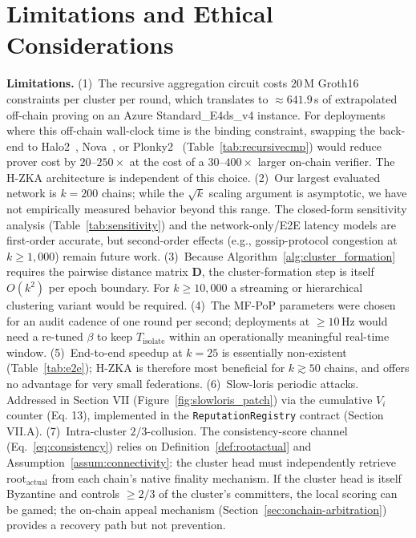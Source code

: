\documentclass[journal]{IEEEtran}
\begin{document}
\section{Limitations and Ethical Considerations}
\label{sec:limitations}

\textbf{Limitations.} (1)~The recursive aggregation circuit costs $20\,$M Groth16 constraints per cluster per round, which translates to $\approx 641.9$\,s of extrapolated off-chain proving on an Azure Standard\_E4ds\_v4 instance. For deployments where this off-chain wall-clock time is the binding constraint, swapping the back-end to Halo2~\cite{bowe2019halo}, Nova~\cite{kothapalli2022nova}, or Plonky2~\cite{plonky2} (Table~\ref{tab:recursivecmp}) would reduce prover cost by $20$--$250\times$ at the cost of a $30$--$400\times$ larger on-chain verifier. The H-ZKA architecture is independent of this choice.
(2)~Our largest evaluated network is $k=200$ chains; while the $\sqrt{k}$ scaling argument is asymptotic, we have not empirically measured behavior beyond this range. The closed-form sensitivity analysis (Table~\ref{tab:sensitivity}) and the network-only/E2E latency models are first-order accurate, but second-order effects (e.g., gossip-protocol congestion at $k\!\ge\!1{,}000$) remain future work.
(3)~Because Algorithm~\ref{alg:cluster_formation} requires the pairwise distance matrix $\mathbf{D}$, the cluster-formation step is itself $O(k^2)$ per epoch boundary. For $k\!\ge\!10{,}000$ a streaming or hierarchical clustering variant would be required.
(4)~The MF-PoP parameters were chosen for an audit cadence of one round per second; deployments at $\ge 10\,$Hz would need a re-tuned $\beta$ to keep $T_{\mathrm{isolate}}$ within an operationally meaningful real-time window.
(5)~End-to-end speedup at $k=25$ is essentially non-existent (Table~\ref{tab:e2e}); H-ZKA is therefore most beneficial for $k \gtrsim 50$ chains, and offers no advantage for very small federations.
(6)~{Slow-loris periodic attacks.} Addressed in Section VII (Figure~\ref{fig:slowloris_patch}) via the cumulative $V_i$ counter (Eq. 13), implemented in the \texttt{ReputationRegistry} contract (Section VII.A).
(7)~{Intra-cluster $2/3$-collusion.} The consistency-score channel (Eq.~\ref{eq:consistency}) relies on Definition~\ref{def:rootactual} and Assumption~\ref{assum:connectivity}: the cluster head must independently retrieve $\text{root}_{\text{actual}}$ from each chain's native finality mechanism. If the cluster head is itself Byzantine {and} controls $\ge 2/3$ of the cluster's committers, the local scoring can be gamed; the on-chain appeal mechanism (Section~\ref{sec:onchain-arbitration}) provides a recovery path but not prevention.
\end{document}
